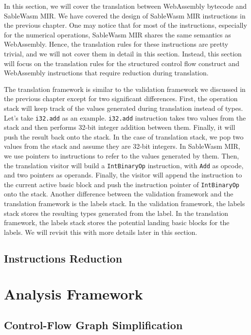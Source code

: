 In this section, we will cover the translation between WebAssembly bytecode and SableWasm MIR. We have covered the design of SableWasm MIR instructions in the previous chapter. One may notice that for most of the instructions, especially for the numerical operations, SableWasm MIR shares the same semantics as WebAssembly. Hence, the translation rules for these instructions are pretty trivial, and we will not cover them in detail in this section. Instead, this section will focus on the translation rules for the structured control flow construct and WebAssembly instructions that require reduction during translation. 

The translation framework is similar to the validation framework we discussed in the previous chapter except for two significant differences. First, the operation stack will keep track of the values generated during translation instead of types. Let's take \texttt{i32.add} as an example. \texttt{i32.add} instruction takes two values from the stack and then performs 32-bit integer addition between them. Finally, it will push the result back onto the stack. In the case of translation stack, we pop two values from the stack and assume they are 32-bit integers. In SableWasm MIR, we use pointers to instructions to refer to the values generated by them. Then, the translation visitor will build a \texttt{IntBinaryOp} instruction, with \texttt{Add} as opcode, and two pointers as operands. Finally, the visitor will append the instruction to the current active basic block and push the instruction pointer of \texttt{IntBinaryOp} onto the stack. Another difference between the validation framework and the translation framework is the labels stack. In the validation framework, the labels stack stores the resulting types generated from the label. In the translation framework, the labels stack stores the potential landing basic blocks for the labels. We will revisit this with more details later in this section.



\subsection{Instructions Reduction}

\section{Analysis Framework}

\subsection{Control-Flow Graph Simplification}

